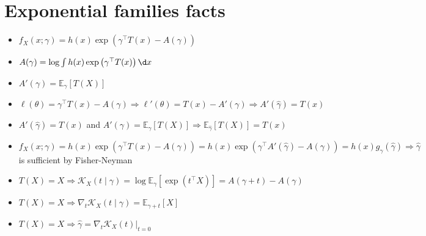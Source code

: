\section{Exponential families facts}

\begin{itemize}
    \item $ f_X(x; \gamma) = h(x)\exp\left(\gamma^\top T(x) - A(\gamma) \right) $
    \item $ A(\gamma) = \log \int h(x)\exp\left(\gamma^\top T(x)\right) \d x $
    \item $A'(\gamma) = \mathbb{E}_\gamma[T(X)]$
    \item $\ell(\theta) = \gamma^\top T(x) - A(\gamma) \Rightarrow \ell'(\theta) = T(x) - A'(\gamma) \Rightarrow A'(\hat\gamma) = T(x)$
    \item $A'(\hat\gamma) = T(x)$ and $A'(\gamma) = \mathbb{E}_\gamma[T(X)] \Rightarrow \mathbb{E}_{\hat\gamma}[T(X)] = T(x)$
    \item $f_X(x; \gamma) = h(x)\exp\left(\gamma^\top T(x) - A(\gamma) \right) = h(x)\exp\left(\gamma^\top A'(\hat\gamma) - A(\gamma) \right) = h(x)g_\gamma(\hat\gamma) \Rightarrow \hat\gamma$ is sufficient by Fisher-Neyman
    \item $T(X) = X \Rightarrow \mathcal{K}_X(t \mid \gamma) = \log \mathbb{E}_\gamma[\exp(t^\top X)] = A(\gamma + t) - A(\gamma) $
    \item $T(X) = X \Rightarrow \nabla_t \mathcal{K}_X(t \mid \gamma) = \mathbb{E}_{\gamma + t}[X] $
    \item $T(X) = X \Rightarrow \hat\gamma = \nabla_t \mathcal{K}_X(t) |_{t=0}$
\end{itemize}

